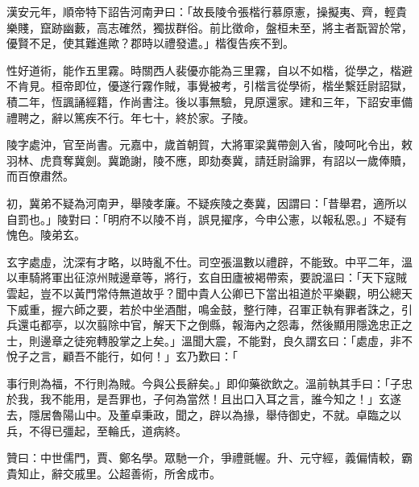 \begin{pinyinscope}
漢安元年，順帝特下詔告河南尹曰：「故長陵令張楷行慕原憲，操擬夷、齊，輕貴樂賤，竄跡幽藪，高志確然，獨拔群俗。前比徵命，盤桓未至，將主者翫習於常，優賢不足，使其難進歟？郡時以禮發遣。」楷復告疾不到。

性好道術，能作五里霧。時關西人裴優亦能為三里霧，自以不如楷，從學之，楷避不肯見。桓帝即位，優遂行霧作賊，事覺被考，引楷言從學術，楷坐繫廷尉詔獄，積二年，恆諷誦經籍，作尚書注。後以事無驗，見原還家。建和三年，下詔安車備禮聘之，辭以篤疾不行。年七十，終於家。子陵。

陵字處沖，官至尚書。元嘉中，歲首朝賀，大將軍梁冀帶劍入省，陵呵叱令出，敕羽林、虎賁奪冀劍。冀跪謝，陵不應，即劾奏冀，請廷尉論罪，有詔以一歲俸贖，而百僚肅然。

初，冀弟不疑為河南尹，舉陵孝廉。不疑疾陵之奏冀，因謂曰：「昔舉君，適所以自罰也。」陵對曰：「明府不以陵不肖，誤見擢序，今申公憲，以報私恩。」不疑有愧色。陵弟玄。

玄字處虛，沈深有才略，以時亂不仕。司空張溫數以禮辟，不能致。中平二年，溫以車騎將軍出征涼州賊邊章等，將行，玄自田廬被褐帶索，要說溫曰：「天下寇賊雲起，豈不以黃門常侍無道故乎？聞中貴人公卿已下當出祖道於平樂觀，明公總天下威重，握六師之要，若於中坐酒酣，鳴金鼓，整行陣，召軍正執有罪者誅之，引兵還屯都亭，以次翦除中官，解天下之倒縣，報海內之怨毒，然後顯用隱逸忠正之士，則邊章之徒宛轉股掌之上矣。」溫聞大震，不能對，良久謂玄曰：「處虛，非不悅子之言，顧吾不能行，如何！」玄乃歎曰：「

事行則為福，不行則為賊。今與公長辭矣。」即仰藥欲飲之。溫前執其手曰：「子忠於我，我不能用，是吾罪也，子何為當然！且出口入耳之言，誰今知之！」玄遂去，隱居魯陽山中。及董卓秉政，聞之，辟以為掾，舉侍御史，不就。卓臨之以兵，不得已彊起，至輪氏，道病終。

贊曰：中世儒門，賈、鄭名學。眾馳一介，爭禮氈幄。升、元守經，義偏情較，霸貴知止，辭交戚里。公超善術，所舍成市。


\end{pinyinscope}